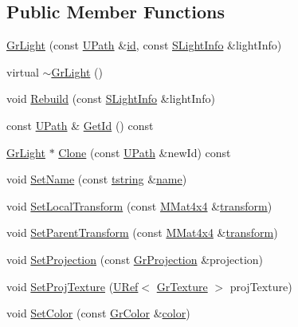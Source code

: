 \subsection*{Public Member Functions}
\begin{CompactItemize}
\item 
\hyperlink{class_gr_light_65657d71433a1ea8ff3639faa63347a0}{GrLight} (const \hyperlink{class_u_path}{UPath} \&\hyperlink{glext__bak_8h_58c2a664503e14ffb8f21012aabff3e9}{id}, const \hyperlink{struct_s_light_info}{SLightInfo} \&lightInfo)
\item 
virtual \hyperlink{class_gr_light_dfbafb36986f1f862ee927ff2b46e566}{$\sim$GrLight} ()
\item 
void \hyperlink{class_gr_light_44ae46cddc4b62539e31d8a861582727}{Rebuild} (const \hyperlink{struct_s_light_info}{SLightInfo} \&lightInfo)
\item 
const \hyperlink{class_u_path}{UPath} \& \hyperlink{class_gr_light_352d37d4c1b11c0d33e34a314367d468}{GetId} () const 
\item 
\hyperlink{class_gr_light}{GrLight} $\ast$ \hyperlink{class_gr_light_6a46f8d5b6f38e19e5eaa01710b648c1}{Clone} (const \hyperlink{class_u_path}{UPath} \&newId) const 
\item 
void \hyperlink{class_gr_light_4b9e87a1336fecc7d8311cd69c64e74d}{SetName} (const \hyperlink{common__afx_8h_816fa58fd77499b0edb2c69ebe803d5c}{tstring} \&\hyperlink{glext__bak_8h_bb62efe59ccdd153ce42e1a418352209}{name})
\item 
void \hyperlink{class_gr_light_60aa163bac55c7876a9c7280519788f4}{SetLocalTransform} (const \hyperlink{class_m_mat4x4}{MMat4x4} \&\hyperlink{glext__bak_8h_07993c0d92c1aeeb357ba0495c8b5325}{transform})
\item 
void \hyperlink{class_gr_light_47b4cf3ca3413ce90fa7ce5318a05943}{SetParentTransform} (const \hyperlink{class_m_mat4x4}{MMat4x4} \&\hyperlink{glext__bak_8h_07993c0d92c1aeeb357ba0495c8b5325}{transform})
\item 
void \hyperlink{class_gr_light_0be864006e4aa859494a5813e435c2e7}{SetProjection} (const \hyperlink{class_gr_projection}{GrProjection} \&projection)
\item 
void \hyperlink{class_gr_light_d954c2024dcae8ba4abd4f8081dc7db9}{SetProjTexture} (\hyperlink{class_u_ref}{URef}$<$ \hyperlink{class_gr_texture}{GrTexture} $>$ projTexture)
\item 
void \hyperlink{class_gr_light_f6585ac78a0365a4b65e58d3d806794b}{SetColor} (const \hyperlink{class_gr_color}{GrColor} \&\hyperlink{glext_8h_3ea846f998d64f079b86052b6c4193a8}{color})

\end{CompactItemize}
